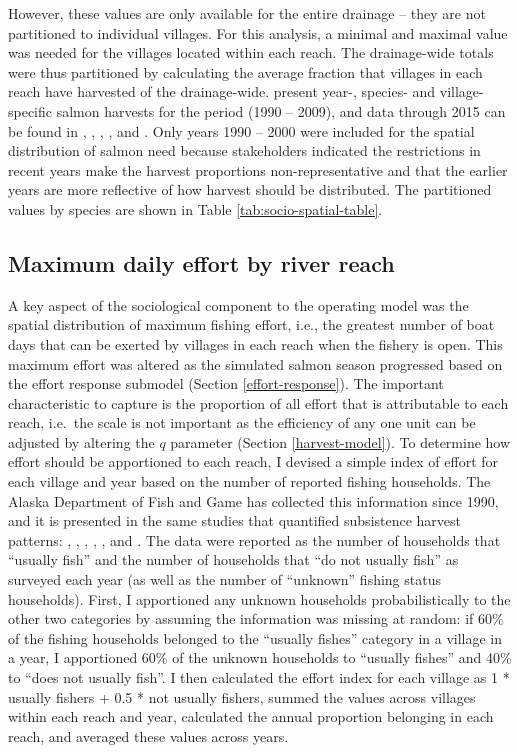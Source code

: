 \documentclass[12pt,]{book}
\theoremstyle{definition}
\theoremstyle{definition}
\theoremstyle{definition}
\theoremstyle{remark}
\begin{document}
However, these values are only available for the entire drainage -- they
are not partitioned to individual villages. For this analysis, a minimal
and maximal value was needed for the villages located within each reach.
The drainage-wide totals were thus partitioned by calculating the
average fraction that villages in each reach have harvested of the
drainage-wide. \citet{hamazaki-2011} present year-, species- and
village-specific salmon harvests for the period (1990 -- 2009), and data
through 2015 can be found in \citet{carroll-hamazaki-2012},
\citet{shelden-etal-2014}, \citet{shelden-etal-2015},
\citet{shelden-etal-2016a}, and \citet{shelden-etal-2016b}. Only years
1990 -- 2000 were included for the spatial distribution of salmon need
because stakeholders indicated the restrictions in recent years make the
harvest proportions non-representative and that the earlier years are
more reflective of how harvest should be distributed. The partitioned
values by species are shown in Table \ref{tab:socio-spatial-table}.

\subsection{Maximum daily effort by river
reach}\label{maximum-daily-effort-by-river-reach}

\noindent
A key aspect of the sociological component to the operating model was
the spatial distribution of maximum fishing effort, i.e., the greatest
number of boat days that can be exerted by villages in each reach when
the fishery is open. This maximum effort was altered as the simulated
salmon season progressed based on the effort response submodel (Section
\ref{effort-response}). The important characteristic to capture is the
proportion of all effort that is attributable to each reach, i.e.~the
scale is not important as the efficiency of any one unit can be adjusted
by altering the \(q\) parameter (Section \ref{harvest-model}). To
determine how effort should be apportioned to each reach, I devised a
simple index of effort for each village and year based on the number of
reported fishing households. The Alaska Department of Fish and Game has
collected this information since 1990, and it is presented in the same
studies that quantified subsistence harvest patterns:
\citet{hamazaki-2011}, \citet{carroll-hamazaki-2012},
\citet{shelden-etal-2014}, \citet{shelden-etal-2015},
\citet{shelden-etal-2016a}, and \citet{shelden-etal-2016b}. The data
were reported as the number of households that ``usually fish'' and the
number of households that ``do not usually fish'' as surveyed each year
(as well as the number of ``unknown'' fishing status households). First,
I apportioned any unknown households probabilistically to the other two
categories by assuming the information was missing at random: if 60\% of
the fishing households belonged to the ``usually fishes'' category in a
village in a year, I apportioned 60\% of the unknown households to
``usually fishes'' and 40\% to ``does not usually fish''. I then
calculated the effort index for each village as 1 * usually fishers +
0.5 * not usually fishers, summed the values across villages within each
reach and year, calculated the annual proportion belonging in each
reach, and averaged these values across years.
\end{document}
